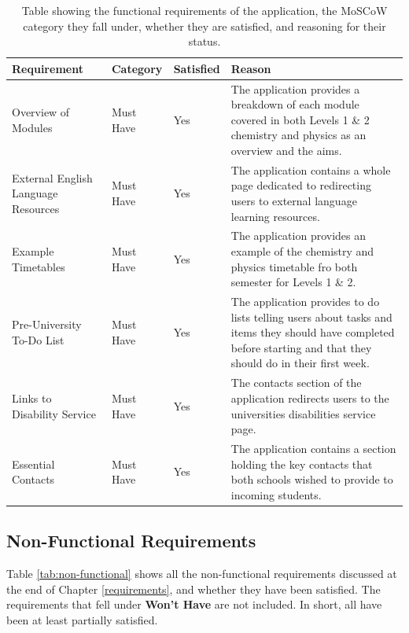 \documentclass{l4proj}
\begin{document}
\begin{table}[ht]
    \caption{Table showing the functional requirements of the application,  the MoSCoW category they fall under,  whether they are satisfied,  and reasoning for their status. }\label{tab:functional}
    \begin{tabular}{ m{3cm}  m{2cm}  m{1.5cm}  m{17em} }
    \hline
    \textbf{Requirement}    & \textbf{Category}                & \textbf{Satisfied}      & \textbf{Reason}                      \\ %
    \hline
    
    Overview of Modules  &  Must Have              & Yes                 & The application provides a breakdown of each module covered in both Levels 1 \& 2 chemistry and physics as an overview and the aims. \\

    External English Language Resources & Must Have & Yes & The application contains a whole page dedicated to redirecting users to external language learning resources. \\

    Example Timetables & Must Have & Yes & The application provides an example of the chemistry and physics timetable fro both semester for Levels 1 \& 2. \\

    Pre-University To-Do List & Must Have & Yes & The application provides to do lists telling users about tasks and items they should have completed before starting and that they should do in their first week. \\
    
    Links to Disability Service & Must Have & Yes & The contacts section of the application redirects users to the universities disabilities service page. \\
    
    Essential Contacts & Must Have & Yes & The application contains a section holding the key contacts that both schools wished to provide to incoming students.

    \end{tabular}
\end{table}

\subsection{Non-Functional Requirements}
Table \ref{tab:non-functional} shows all the non-functional requirements discussed at the end of Chapter \ref{requirements},  and whether they have been satisfied. The requirements that fell under \textbf{Won't Have} are not included. In short,  all have been at least partially satisfied.
\end{document}
